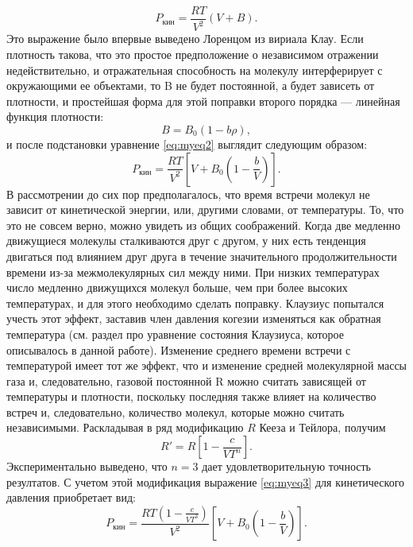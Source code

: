 \documentclass[a4paper]{article}
\numberwithin{equation}{subsection} %
\begin{document}
\begin{enumerate}
\begin{equation}
P_{\text{кин}} = \frac{RT}{V^2}(V + B). \label{eq:myeq2}
\end{equation}
Это выражение было впервые выведено Лоренцом из вириала Клау. Если плотность такова, что это простое предположение о независимом отражении недействительно, и отражательная способность на молекулу интерферирует с окружающими ее объектами, то B не будет постоянной, а будет зависеть от плотности, и простейшая форма для этой поправки второго порядка — линейная функция плотности:
\begin{equation}
B = B_0(1 - b\rho),
\end{equation}
и после подстановки уравнение \ref{eq:myeq2} выглядит следующим образом:
\begin{equation}
P_{\text{кин}} = \frac{RT}{V^2}\left[V + B_0\left(1 - \frac{b}{V}\right)\right]. \label{eq:myeq3}
\end{equation}
В рассмотрении до сих пор предполагалось, что
время встречи молекул не зависит от кинетической
энергии, или, другими словами, от температуры. То, что это не совсем
верно, можно увидеть из общих соображений. Когда две медленно
движущиеся молекулы сталкиваются друг с другом, у них есть тенденция
двигаться под влиянием друг друга в течение значительного
продолжительности времени из-за межмолекулярных сил между ними. При низких температурах число медленно движущихся молекул
больше, чем при более высоких температурах, и для этого необходимо сделать поправку. Клаузиус попытался учесть этот эффект, заставив
член давления когезии изменяться как обратная температура (см. раздел про уравнение состояния Клаузиуса, которое описывалось в данной работе). Изменение среднего времени
встречи с температурой имеет тот же эффект, что и изменение
средней молекулярной массы газа и, следовательно, газовой постоянной
R можно считать зависящей от температуры и плотности,
поскольку последняя также влияет на количество встреч и, следовательно, количество молекул, которые можно считать независимыми. Раскладывая в ряд модификацию $R$ Кееза и Тейлора, получим
\begin{equation}
R' = R\left[1-\frac{c}{VT^n}\right].
\end{equation}
Экспериментально выведено, что $n = 3$ дает удовлетворительную точность резултатов. С учетом этой модификация выражение \ref{eq:myeq3} для кинетического давления приобретает вид:
\begin{equation}
P_{\text{кин}} = \frac{RT\left(1-\frac{c}{VT^3}\right)}{V^2}\left[V + B_0\left(1 - \frac{b}{V}\right)\right]. \label{eq:myeq4}
\end{equation}

\end{enumerate}
\end{document}
